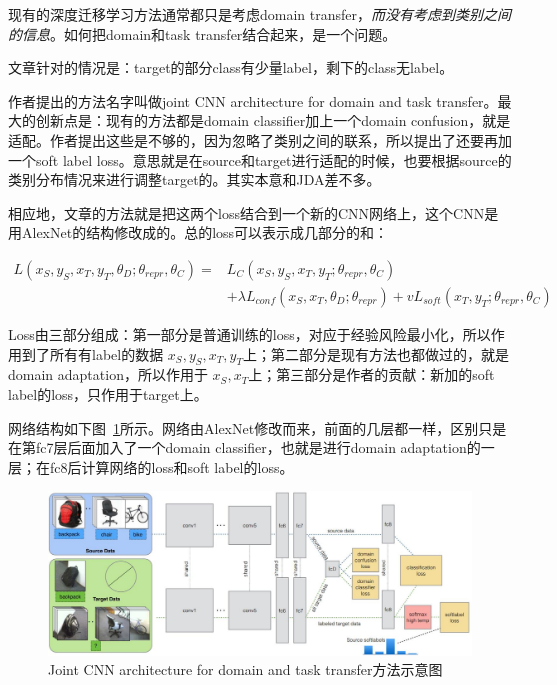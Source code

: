 现有的深度迁移学习方法通常都只是考虑domain transfer，\textit{而没有考虑到类别之间的信息}。如何把domain和task transfer结合起来，是一个问题。

文章针对的情况是：target的部分class有少量label，剩下的class无label。

作者提出的方法名字叫做joint CNN architecture for domain and task transfer。最大的创新点是：现有的方法都是domain classifier加上一个domain confusion，就是适配。作者提出这些是不够的，因为忽略了类别之间的联系，所以提出了还要再加一个soft label loss。意思就是在source和target进行适配的时候，也要根据source的类别分布情况来进行调整target的。其实本意和JDA差不多。

相应地，文章的方法就是把这两个loss结合到一个新的CNN网络上，这个CNN是用AlexNet的结构修改成的。总的loss可以表示成几部分的和：

\begin{equation}
\begin{split}
L(x_S,y_S,x_T,y_T,\theta_D;\theta_{repr},\theta_C)=&L_C(x_S,y_S,x_T,y_T;\theta_{repr},\theta_C)\\
&+\lambda L_{conf}(x_S,x_T,\theta_D;\theta_{repr})+v L_{soft}(x_T,y_T;\theta_{repr},\theta_C)
\end{split}
\end{equation}

Loss由三部分组成：第一部分是普通训练的loss，对应于经验风险最小化，所以作用到了所有有label的数据 $x_S,y_S,x_T,y_T$上；第二部分是现有方法也都做过的，就是domain adaptation，所以作用于 $x_S,x_T$上；第三部分是作者的贡献：新加的soft label的loss，只作用于target上。

网络结构如下图~\ref{fig-deep-tzeng2015}所示。网络由AlexNet修改而来，前面的几层都一样，区别只是在第fc7层后面加入了一个domain classifier，也就是进行domain adaptation的一层；在fc8后计算网络的loss和soft label的loss。

\begin{figure}[htbp]
	\centering
	\includegraphics[scale=0.38]{./figures/fig-deep-tzeng2015.pdf}
	\caption{Joint CNN architecture for domain and task transfer方法示意图}
	\label{fig-deep-tzeng2015}
\end{figure}

